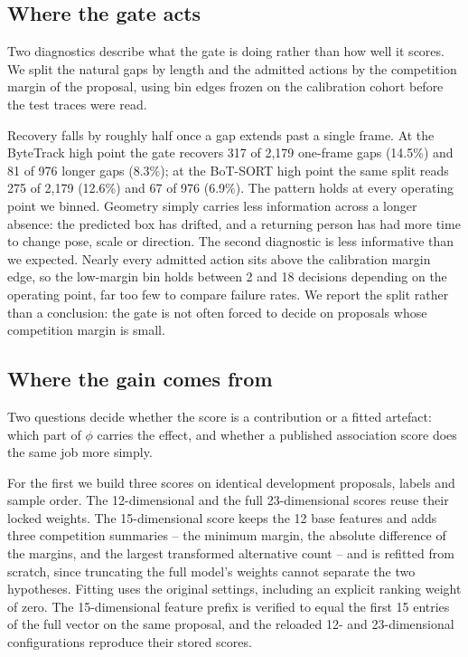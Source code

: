 \subsection{Where the gate acts}

Two diagnostics describe what the gate is doing rather than how well it
scores. We split the natural gaps by length and the admitted actions by the
competition margin of the proposal, using bin edges frozen on the
calibration cohort before the test traces were read.

Recovery falls by roughly half once a gap extends past a single frame. At
the ByteTrack high point the gate recovers 317 of 2,179 one-frame gaps
(14.5\%) and 81 of 976 longer gaps (8.3\%); at the BoT-SORT high point the
same split reads 275 of 2,179 (12.6\%) and 67 of 976 (6.9\%). The pattern
holds at every operating point we binned. Geometry simply carries less
information across a longer absence: the predicted box has drifted, and a
returning person has had more time to change pose, scale or direction. The
second diagnostic is less informative than we expected. Nearly every
admitted action sits above the calibration margin edge, so the low-margin
bin holds between 2 and 18 decisions depending on the operating point, far
too few to compare failure rates. We report the split rather than a
conclusion: the gate is not often forced to decide on proposals whose
competition margin is small.

\subsection{Where the gain comes from}
\label{sec:ablation}

Two questions decide whether the score is a contribution or a fitted
artefact: which part of $\phi$ carries the effect, and whether a published
association score does the same job more simply.

For the first we build three scores on identical development proposals,
labels and sample order. The 12-dimensional and the full 23-dimensional
scores reuse their locked weights. The 15-dimensional score keeps the 12
base features and adds three competition summaries -- the minimum margin,
the absolute difference of the margins, and the largest transformed
alternative count -- and is refitted from scratch, since truncating the
full model's weights cannot separate the two hypotheses. Fitting uses the
original settings, including an explicit ranking weight of zero. The
15-dimensional feature prefix is verified to equal the first 15 entries of
the full vector on the same proposal, and the reloaded 12- and
23-dimensional configurations reproduce their stored scores.

